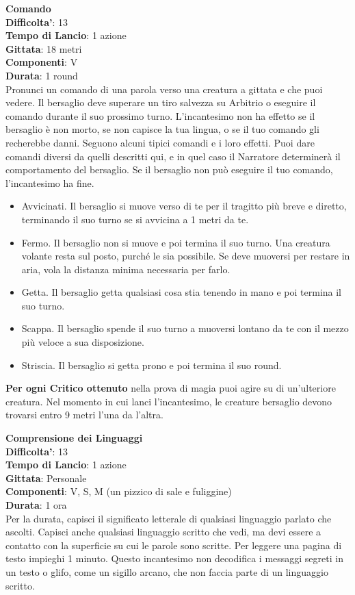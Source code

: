 \begin{multicols}{2}
\medskip\textbf{Comando}\\
\textbf{Difficolta'}: 13\\
\textbf{Tempo di Lancio}: 1 azione\\
\textbf{Gittata}: 18 metri\\
\textbf{Componenti}: V\\
\textbf{Durata}: 1 round\\
Pronunci un comando di una parola verso una creatura a gittata e che puoi vedere. Il bersaglio deve superare un tiro salvezza su Arbitrio o eseguire il comando durante il suo prossimo turno. L’incantesimo non ha effetto se il bersaglio è non morto, se non capisce la tua lingua, o se il tuo comando gli recherebbe danni. Seguono alcuni tipici comandi e i loro effetti. Puoi dare comandi diversi da quelli descritti qui, e in quel caso il Narratore determinerà il comportamento del bersaglio. Se il bersaglio non può eseguire il tuo comando, l’incantesimo ha fine.
\begin{itemize}
	\item 
Avvicinati. Il bersaglio si muove verso di te per il tragitto più breve e diretto, terminando il suo turno se si avvicina a 1 metri da te.
	\item 
Fermo. Il bersaglio non si muove e poi termina il suo turno. Una creatura volante resta sul posto, purché le sia possibile. Se deve muoversi per restare in aria, vola la distanza minima necessaria per farlo.
	\item 
	Getta. Il bersaglio getta qualsiasi cosa stia tenendo in mano e poi termina il suo turno. 	\item 
	Scappa. Il bersaglio spende il suo turno a muoversi lontano da te con il mezzo più veloce a sua disposizione.
	\item  Striscia. Il bersaglio si getta prono e poi termina il suo round.
\end{itemize}

\textbf{Per ogni Critico ottenuto} nella prova di magia puoi agire su di un’ulteriore creatura. Nel momento in cui lanci l’incantesimo, le creature bersaglio devono trovarsi entro 9 metri l’una da l’altra.


\medskip\textbf{Comprensione dei Linguaggi}\\
\textbf{Difficolta'}: 13\\
\textbf{Tempo di Lancio}: 1 azione\\
\textbf{Gittata}: Personale\\
\textbf{Componenti}: V, S, M (un pizzico di sale e fuliggine)\\
\textbf{Durata}: 1 ora\\
Per la durata, capisci il significato letterale di qualsiasi linguaggio parlato che ascolti. Capisci anche qualsiasi linguaggio scritto che vedi, ma devi essere a contatto con la superficie su cui le parole sono scritte. Per leggere una pagina di testo impieghi 1 minuto. Questo incantesimo non decodifica i messaggi segreti in un testo o glifo, come un sigillo arcano, che non faccia parte di un linguaggio scritto.



\end{multicols}
